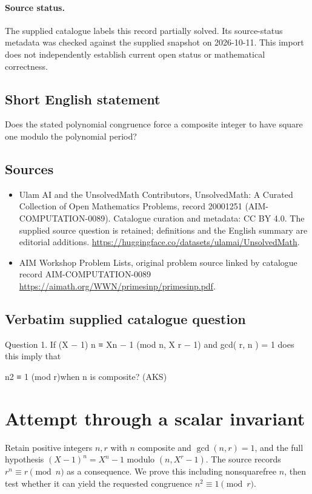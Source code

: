 \documentclass[11pt]{article}
\begin{document}
\paragraph{Source status.}
The supplied catalogue labels this record partially solved. Its source-status metadata was checked against the supplied snapshot on 2026-10-11. This import does not independently establish current open status or mathematical correctness.
\subsection{Short English statement}
Does the stated polynomial congruence force a composite integer to have square one modulo the polynomial period?
\subsection{Sources}
\begin{itemize}
\item[S1] Ulam AI and the UnsolvedMath Contributors, UnsolvedMath: A Curated Collection of Open Mathematics Problems, record 20001251 (AIM-COMPUTATION-0089). Catalogue curation and metadata: CC BY 4.0. The supplied source question is retained; definitions and the English summary are editorial additions.
\url{https://huggingface.co/datasets/ulamai/UnsolvedMath}.
\item[S2] AIM Workshop Problem Lists, original problem source linked by catalogue record AIM-COMPUTATION-0089
\url{https://aimath.org/WWN/primesinp/primesinp.pdf}.
\end{itemize}
\subsection{Verbatim supplied catalogue question}
Question 1. If (X − 1) n ≡ Xn − 1 (mod n, X r − 1) and gcd( r, n ) = 1 does this imply that

n2 ≡ 1 (mod r)when n is composite? (AKS)

\section{Attempt through a scalar invariant}
Retain positive integers $n,r$ with $n$ composite and $\gcd(n,r)=1$,
and the full hypothesis $(X-1)^n=X^n-1$ modulo $(n,X^r-1)$.
The source records $r^n\equiv r\pmod n$ as a consequence. We prove
this including nonsquarefree $n$, then test whether it can yield the
requested congruence $n^2\equiv1\pmod r$.
\end{document}
